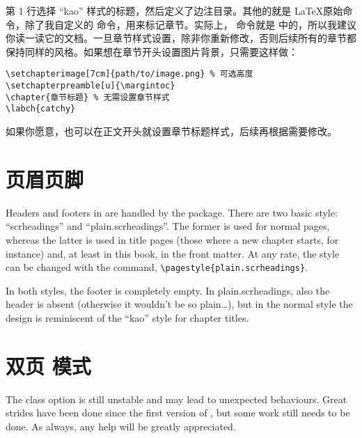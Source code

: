 第 1 行选择 \enquote{kao} 样式的标题，然后定义了边注目录。其他的就是 \LaTeX 原始命令，除了我自定义的  命令，用来标记章节。实际上， 命令就是 \KOMAScript 中的，所以我建议你读一读它的文档。一旦章节样式设置，除非你重新修改，否则后续所有的章节都保持同样的风格。如果想在章节开头设置图片背景，只需要这样做：

\begin{lstlisting}
\setchapterimage[7cm]{path/to/image.png} % 可选高度
\setchapterpreamble[u]{\margintoc}
\chapter{章节标题} % 无需设置章节样式
\labch{catchy}
\end{lstlisting}

如果你愿意，也可以在正文开头就设置章节标题样式，后续再根据需要修改。

\section{页眉页脚}

Headers and footers in \KOMAScript\xspace are handled by the
 package. There are two basic style:
\enquote{scrheadings} and \enquote{plain.scrheadings}. The former is
used for normal pages, whereas the latter is used in title pages (those
where a new chapter starts, for instance) and, at least in this book, in
the front matter. At any rate, the style can be changed with the
 command, \eg
\lstinline|\pagestyle{plain.scrheadings}|.

In both styles, the footer is completely empty. In plain.scrheadings,
also the header is absent (otherwise it wouldn't be so plain\ldots), but
in the normal style the design is reminiscent of the \enquote{kao} style
for chapter titles.

\section{双页  模式}

\begin{kaobox}[frametitle=To Do]
The  class option is still unstable and may lead to
unexpected behaviours. Great strides have been done since the first
version of , but some work still needs to be done. As
always, any help will be greatly appreciated.
\end{kaobox}

